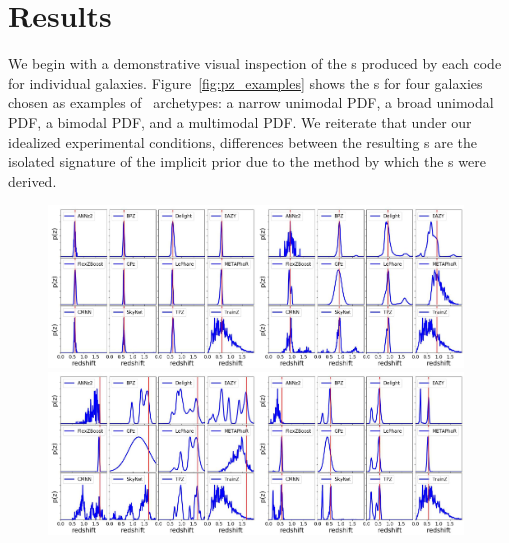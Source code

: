 \section{Results}
\label{sec:results}

We begin with a demonstrative visual inspection of the \pzpdf s produced by each code for individual galaxies.
Figure~\ref{fig:pz_examples} shows the \pzpdf s for four galaxies chosen as examples of \pzpdf\ archetypes: a narrow unimodal PDF, a broad unimodal PDF, a bimodal PDF, and a multimodal PDF.
We reiterate that under our idealized experimental conditions, differences between the resulting \pzpdf s are the isolated signature of the implicit prior due to the method by which the \pzpdf s were derived.

\begin{figure}
\includegraphics[width=0.49\textwidth]{fig/pz_12codes_261931_biglabels_crop.jpg}\includegraphics[width=0.49\textwidth]{fig/pz_12codes_471167_biglabels_crop.jpg}\\
\includegraphics[width=0.49\textwidth]{fig/pz_12codes_713178_biglabels_crop.jpg}\includegraphics[width=0.49\textwidth]{fig/pz_12codes_982747_biglabels_crop.jpg}

\end{figure}
